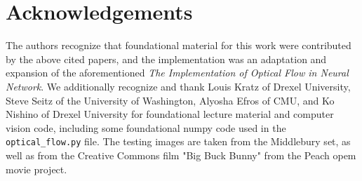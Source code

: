 \documentclass[]{article}
\begin{document}
    \section{Acknowledgements}\label{sec:acknowledgements}
    The authors recognize that foundational material for this work were contributed by the above cited papers, and the implementation was an adaptation and expansion of the aforementioned \textit{The Implementation of Optical Flow in Neural Network}.
    We additionally recognize and thank Louis Kratz of Drexel University, Steve Seitz of the University of Washington, Alyosha Efros of CMU, and Ko Nishino of Drexel University for foundational lecture material and computer vision code, including some foundational numpy code used in the \verb|optical_flow.py| file.
    The testing images are taken from the Middlebury set, as well as from the Creative Commons film "Big Buck Bunny" from the Peach opem movie project.

    \listoffigures

    \printbibliography
\end{document}
